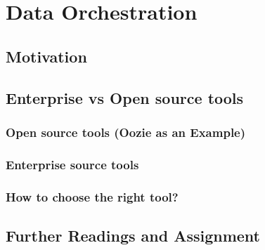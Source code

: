 \section{Data Orchestration}
\subsection{Motivation}
\subsection{Enterprise vs Open source tools}
\subsubsection{Open source tools (Oozie as an Example)}
\subsubsection{Enterprise source tools}
\subsubsection{How to choose the right tool?}
\subsection{Further Readings and Assignment}
